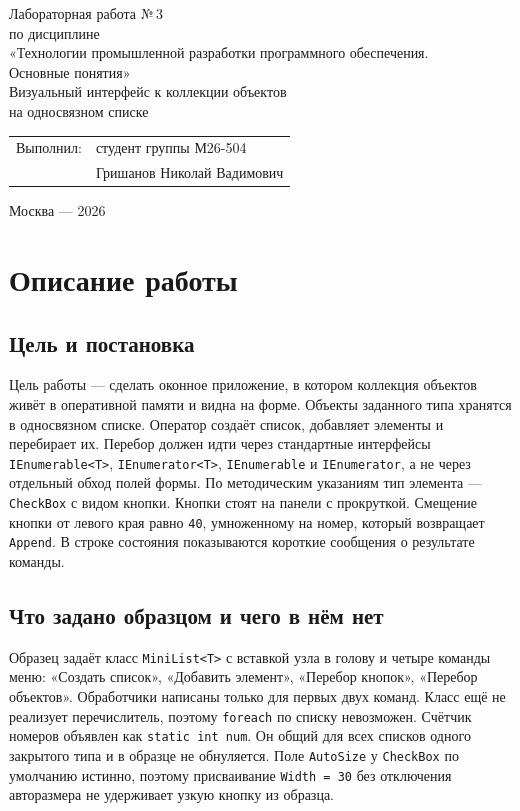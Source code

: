 \documentclass[a4paper,14pt]{extarticle}
\begin{document}
\begin{titlepage}
\centering
\vspace*{2.2cm}
{\Large Лабораторная работа №\,3}\\[10pt]
по дисциплине\\
«Технологии промышленной разработки программного обеспечения.\\
Основные понятия»\\[18pt]
{\large Визуальный интерфейс к коллекции объектов\\
на односвязном списке}\\[56pt]
\begin{flushleft}
\hspace{0.42\textwidth}
\begin{tabular}{ll}
Выполнил: & студент группы М26-504\\[8pt]
& Гришанов Николай Вадимович\\
\end{tabular}
\end{flushleft}
\vfill
Москва — 2026
\end{titlepage}
\tableofcontents
\newpage
\section{Описание работы}
\subsection{Цель и постановка}
Цель работы — сделать оконное приложение, в котором коллекция объектов живёт в оперативной памяти и видна на форме. Объекты заданного типа хранятся в односвязном списке. Оператор создаёт список, добавляет элементы и перебирает их. Перебор должен идти через стандартные интерфейсы \texttt{IEnumerable<T>}, \texttt{IEnumerator<T>}, \texttt{IEnumerable} и \texttt{IEnumerator}, а не через отдельный обход полей формы.
По методическим указаниям тип элемента — \texttt{CheckBox} с видом кнопки. Кнопки стоят на панели с прокруткой. Смещение кнопки от левого края равно \texttt{40}, умноженному на номер, который возвращает \texttt{Append}. В строке состояния показываются короткие сообщения о результате команды.
\subsection{Что задано образцом и чего в нём нет}
Образец задаёт класс \texttt{MiniList<T>} с вставкой узла в голову и четыре команды меню: «Создать список», «Добавить элемент», «Перебор кнопок», «Перебор объектов». Обработчики написаны только для первых двух команд. Класс ещё не реализует перечислитель, поэтому \texttt{foreach} по списку невозможен.
Счётчик номеров объявлен как \texttt{static int num}. Он общий для всех списков одного закрытого типа и в образце не обнуляется. Поле \texttt{AutoSize} у \texttt{CheckBox} по умолчанию истинно, поэтому присваивание \texttt{Width = 30} без отключения авторазмера не удерживает узкую кнопку из образца.
\end{document}
